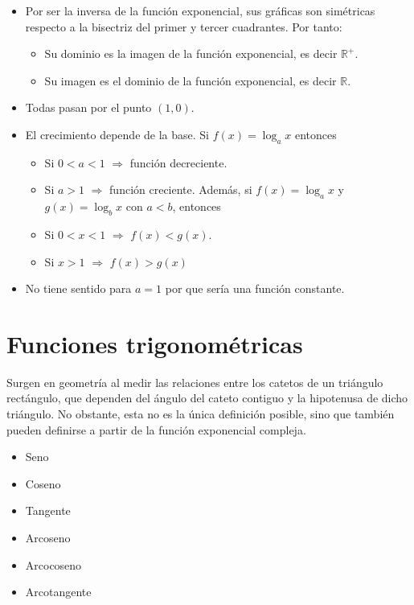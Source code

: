 \documentclass[
  a4paper,
]{scrreport}
\providecommand{\tightlist}{%
  \setlength{\itemsep}{0pt}\setlength{\parskip}{0pt}}\usepackage{longtable,booktabs,array}
\theoremstyle{plain}
\theoremstyle{plain}
\theoremstyle{definition}
\theoremstyle{plain}
\theoremstyle{definition}
\theoremstyle{remark}
\begin{document}
\begin{itemize}
\tightlist
\item
  Por ser la inversa de la función exponencial, sus gráficas son
  simétricas respecto a la bisectriz del primer y tercer cuadrantes. Por
  tanto:

  \begin{itemize}
  \tightlist
  \item
    Su dominio es la imagen de la función exponencial, es decir
    \(\mathbb{R}^+\).
  \item
    Su imagen es el dominio de la función exponencial, es decir
    \(\mathbb{R}\).
  \end{itemize}
\item
  Todas pasan por el punto \((1,0)\).
\item
  El crecimiento depende de la base. Si \(f(x)=\log_a x\) entonces

  \begin{itemize}
  \tightlist
  \item
    Si \(0<a<1\) \(\Rightarrow\) función decreciente.
  \item
    Si \(a>1\) \(\Rightarrow\) función creciente. Además, si
    \(f(x)=\log_a x\) y \(g(x)=\log_b x\) con \(a<b\), entonces
  \item
    Si \(0<x<1\) \(\Rightarrow\) \(f(x)<g(x)\).
  \item
    Si \(x>1\) \(\Rightarrow\) \(f(x)>g(x)\)
  \end{itemize}
\item
  No tiene sentido para \(a=1\) por que sería una función constante.
\end{itemize}

\hypertarget{funciones-trigonomuxe9tricas}{%
\section{Funciones trigonométricas}\label{funciones-trigonomuxe9tricas}}

Surgen en geometría al medir las relaciones entre los catetos de un
triángulo rectángulo, que dependen del ángulo del cateto contiguo y la
hipotenusa de dicho triángulo. No obstante, esta no es la única
definición posible, sino que también pueden definirse a partir de la
función exponencial compleja.

\begin{itemize}
\tightlist
\item
  Seno
\item
  Coseno
\item
  Tangente
\item
  Arcoseno
\item
  Arcocoseno
\item
  Arcotangente
\end{itemize}
\end{document}
